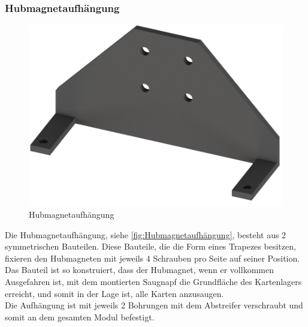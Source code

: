 \subsubsection{Hubmagnetaufhängung}
\begin{figure}
    \includegraphics[width=8 cm]{fig/mech/AufhaengungHubmahgnet}
    \caption{Hubmagnetaufhängung}
    \label{fig:Hubmagnetaufhängung}
\end{figure}
Die Hubmagnetaufhängung, siehe \autoref{fig:Hubmagnetaufhängung}, besteht aus 2 symmetrischen Bauteilen. Diese Bauteile, die die Form eines Trapezes besitzen, fixieren den
Hubmagneten mit jeweils 4 Schrauben pro Seite auf seiner Position. Das Bauteil ist so konstruiert, dass der Hubmagnet, wenn er
vollkommen Ausgefahren ist, mit dem montierten Saugnapf die Grundfläche des Kartenlagers erreicht, und somit in der Lage ist,
alle Karten anzusaugen.\\
Die Aufhängung ist mit jeweils 2 Bohrungen mit dem Abstreifer verschraubt und somit an dem gesamten Modul befestigt.



